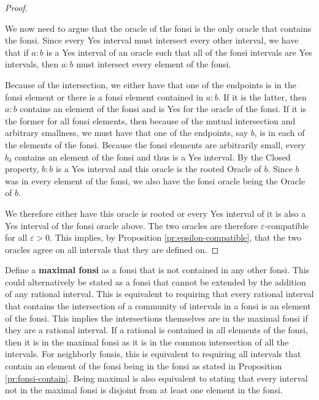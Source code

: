 \documentclass[12pt]{article}
\begin{document}
\begin{proof}
\begin{enumerate}
\end{enumerate}

We now need to argue that the oracle of the fonsi is the only oracle that contains the fonsi. Since every Yes interval must intersect every other interval, we have that if $a:b$ is a Yes interval of an oracle such that all of the fonsi intervals are Yes intervals, then $a:b$ must intersect every element of the fonsi. 

Because of the intersection, we either have that one of the endpoints is in the fonsi element or there is a fonsi element contained in $a:b$. If it is the latter, then $a:b$ contains an element of the fonsi and is Yes for the oracle of the fonsi. If it is the former for all fonsi elements, then because of the mutual intersection and arbitrary smallness, we must have that one of the endpoints, say $b$, is in each of the elements of the fonsi.  Because the fonsi elements are arbitrarily small, every $b_\delta$ contains an element of the fonsi and thus is a Yes interval. By the Closed property, $b:b$ is a Yes interval and this oracle is the rooted Oracle of $b$. Since $b$ was in every element of the fonsi, we also have the fonsi oracle being the Oracle of $b$.

We therefore either have this oracle is rooted or every Yes interval of it is also a Yes interval of the fonsi oracle above. The two oracles are therefore $\varepsilon$-compatible for all $\varepsilon > 0$. This implies, by Proposition \ref{pr:epsilon-compatible}, that the two oracles agree on all intervals that they are defined on.

\end{proof}

Define a \textbf{maximal fonsi} as a fonsi that is not contained in any other fonsi. This could alternatively be stated as a fonsi that cannot be extended by the addition of any rational interval. This is equivalent to requiring that every rational interval that contains the intersection of a community of intervals in a fonsi is an element of the fonsi. This implies the intersections themselves are in the maximal fonsi if they are a rational interval. If a rational is contained in  all elements of the fonsi, then it is in the maximal fonsi as it is in the common intersection of all the intervals. For neighborly fonsis, this is equivalent to requiring all intervals that contain an element of the fonsi being in the fonsi as stated in Proposition \ref{pr:fonsi-contain}. Being maximal is also equivalent to stating that every interval not in the maximal fonsi is disjoint from at least one element in the fonsi. 
\end{document}
